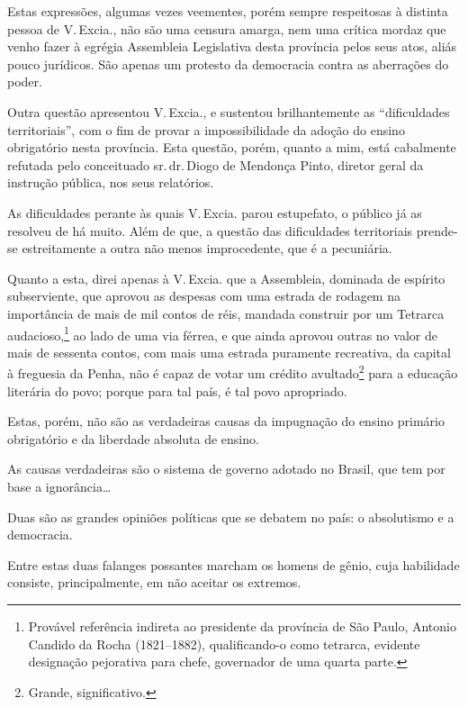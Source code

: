 Estas expressões, algumas vezes veementes, porém sempre respeitosas à
distinta pessoa de V.\,Excia., não são uma censura amarga, nem uma
crítica mordaz que venho fazer à egrégia Assembleia Legislativa desta
província pelos seus atos, aliás pouco jurídicos. São apenas um protesto
da democracia contra as aberrações do poder.

Outra questão apresentou V.\,Excia., e sustentou brilhantemente as
``dificuldades territoriais'', com o fim de provar a impossibilidade da
adoção do ensino obrigatório nesta província. Esta questão, porém,
quanto a mim, está cabalmente refutada pelo conceituado sr.\,dr.\,Diogo de
Mendonça Pinto, diretor geral da instrução pública, nos seus relatórios.

As dificuldades perante às quais V.\,Excia. parou estupefato, o público
já as resolveu de há muito. Além de que, a questão das dificuldades
territoriais prende-se estreitamente a outra não menos improcedente, que
é a pecuniária.

Quanto a esta, direi apenas à V.\,Excia. que a Assembleia, dominada de
espírito subserviente, que aprovou as despesas com uma estrada de
rodagem na importância de mais de mil contos de réis, mandada construir
por um Tetrarca audacioso,\footnote{Provável referência indireta ao
  presidente da província de São Paulo, Antonio Candido da Rocha
  (1821--1882), qualificando-o como tetrarca, evidente designação
  pejorativa para chefe, governador de uma quarta parte.} ao lado de
uma via férrea, e que ainda aprovou outras no valor de mais de sessenta
contos, com mais uma estrada puramente recreativa, da capital à
freguesia da Penha, não é capaz de votar um crédito avultado\footnote{
  Grande, significativo.} para a educação literária do povo; porque para
tal país, é tal povo apropriado.

Estas, porém, não são as verdadeiras causas da impugnação do ensino
primário obrigatório e da liberdade absoluta de ensino.

As causas verdadeiras são o sistema de governo adotado no Brasil, que
tem por base a ignorância\ldots

Duas são as grandes opiniões políticas que se debatem no país: o
absolutismo e a democracia.

Entre estas duas falanges possantes marcham os homens de gênio, cuja
habilidade consiste, principalmente, em não aceitar os extremos.

